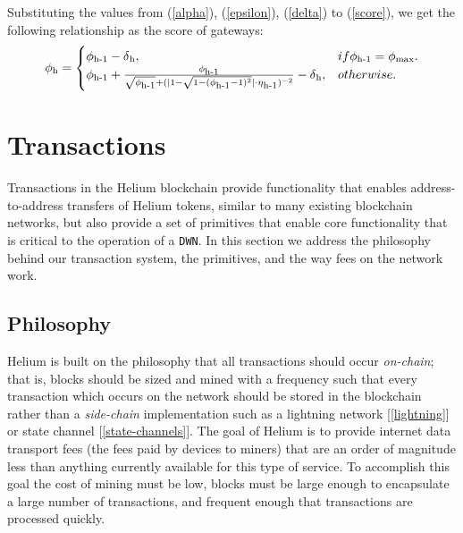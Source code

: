 \documentclass[letterpaper,11pt]{article}
\begin{document}
Substituting the values from (\ref{alpha}), (\ref{epsilon}), (\ref{delta}) to (\ref{score}), we get the following relationship as the score of gateways:
\begin{equation} \label{recurrence}
	\phi\textsubscript{h} = \begin{cases}
		\phi\textsubscript{h-1} - \delta\textsubscript{h}, &if \phi\textsubscript{h-1} = \phi\textsubscript{max}.\\
		\phi\textsubscript{h-1} + \frac{\phi\textsubscript{h-1}}{\sqrt{\phi\textsubscript{h-1}} + (\lvert1 - \sqrt{1 - (\phi\textsubscript{h-1} - 1)^2}\rvert \cdot \eta\textsubscript{h-1})^{-2}} -\delta\textsubscript{h}, &{otherwise}.
	\end{cases}
\end{equation}


\newpage

\section{Transactions}\label{transactions}

Transactions in the Helium blockchain provide functionality that enables address-to-address transfers of Helium tokens, similar to many existing blockchain networks, but also provide a set of primitives that enable core functionality that is critical to the operation of a \verb|DWN|. In this section we address the philosophy behind our transaction system, the primitives, and the way fees on the network work.

\subsection{Philosophy}

Helium is built on the philosophy that all transactions should occur \emph{on-chain}; that is, blocks should be sized and mined with a frequency such that every transaction which occurs on the network should be stored in the blockchain rather than a \emph{side-chain} implementation such as a lightning network [\ref{lightning}] or state channel [\ref{state-channels}]. The goal of Helium is to provide internet data transport fees (the fees paid by devices to miners) that are an order of magnitude less than anything currently available for this type of service. To accomplish this goal the cost of mining must be low, blocks must be large enough to encapsulate a large number of transactions, and frequent enough that transactions are processed quickly.
\end{document}
